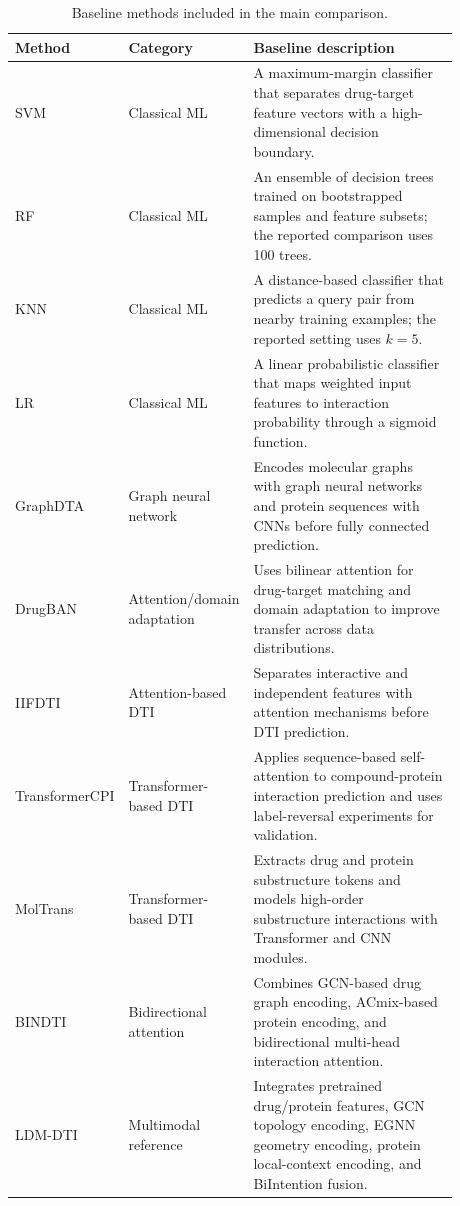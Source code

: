 \begin{table}[!htbp]
\caption{Baseline methods included in the main comparison.}
\label{tab:baseline_sources}
\begin{center}
\scriptsize
\setlength{\tabcolsep}{3pt}
\begin{tabular}{>{\raggedright\arraybackslash}p{0.15\linewidth}>{\raggedright\arraybackslash}p{0.18\linewidth}>{\raggedright\arraybackslash}p{0.55\linewidth}}
\toprule
Method & Category & Baseline description \\
\midrule
SVM \citep{cortes1995svm} & Classical ML & A maximum-margin classifier that separates drug-target feature vectors with a high-dimensional decision boundary. \\
RF \citep{breiman2001random} & Classical ML & An ensemble of decision trees trained on bootstrapped samples and feature subsets; the reported comparison uses 100 trees. \\
KNN \citep{guo2003knn} & Classical ML & A distance-based classifier that predicts a query pair from nearby training examples; the reported setting uses $k=5$. \\
LR \citep{friedman2000logistic} & Classical ML & A linear probabilistic classifier that maps weighted input features to interaction probability through a sigmoid function. \\
GraphDTA \citep{nguyen2021graphdta} & Graph neural network & Encodes molecular graphs with graph neural networks and protein sequences with CNNs before fully connected prediction. \\
DrugBAN \citep{bai2023drugban} & Attention/domain adaptation & Uses bilinear attention for drug-target matching and domain adaptation to improve transfer across data distributions. \\
IIFDTI \citep{cheng2022iifdti} & Attention-based DTI & Separates interactive and independent features with attention mechanisms before DTI prediction. \\
TransformerCPI \citep{chen2020transformercpi} & Transformer-based DTI & Applies sequence-based self-attention to compound-protein interaction prediction and uses label-reversal experiments for validation. \\
MolTrans \citep{huang2021moltrans} & Transformer-based DTI & Extracts drug and protein substructure tokens and models high-order substructure interactions with Transformer and CNN modules. \\
BINDTI \citep{peng2024bindti} & Bidirectional attention & Combines GCN-based drug graph encoding, ACmix-based protein encoding, and bidirectional multi-head interaction attention. \\
LDM-DTI \citep{ji2026ldmdti} & Multimodal reference & Integrates pretrained drug/protein features, GCN topology encoding, EGNN geometry encoding, protein local-context encoding, and BiIntention fusion. \\
\bottomrule
\end{tabular}
\end{center}
\end{table}

